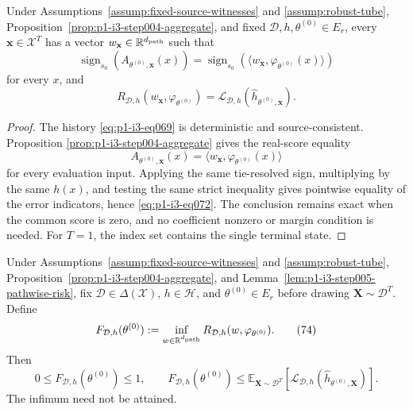 \begin{lemma}
\label{lem:p1-i3-step005-pathwise-risk}
Under Assumptions~\ref{assump:fixed-source-witnesses} and
\ref{assump:robust-tube}, Proposition~\ref{prop:p1-i3-step004-aggregate},
and fixed $\mathcal D,h,\theta^{(0)}\in E_r$, every
$\mathbf x\in\mathcal X^T$ has a vector $w_{\mathbf x}\in\mathbb R^{d_{\rm path}}$
such that
\[
\operatorname{sign}_{s_0}(A_{\theta^{(0)},\mathbf x}(x))
=\operatorname{sign}_{s_0}
\left(\langle w_{\mathbf x},\varphi_{\theta^{(0)}}(x)\rangle\right)
\tag{71}\label{eq:p1-i3-eq071}
\]
for every $x$, and
\[
R_{\mathcal D,h}(w_{\mathbf x},\varphi_{\theta^{(0)}})
=\mathcal L_{\mathcal D,h}(\widehat h_{\theta^{(0)},\mathbf x}).
\tag{72}\label{eq:p1-i3-eq072}
\]
\end{lemma}

\begin{proof}
The history \eqref{eq:p1-i3-eq069} is deterministic and source-consistent.  Proposition
\ref{prop:p1-i3-step004-aggregate} gives the real-score equality
\[
A_{\theta^{(0)},\mathbf x}(x)
=\langle w_{\mathbf x},\varphi_{\theta^{(0)}}(x)\rangle
\tag{73}\label{eq:p1-i3-eq073}
\]
for every evaluation input.  Applying the same tie-resolved sign, multiplying
by the same $h(x)$, and testing the same strict inequality gives pointwise
equality of the error indicators, hence \eqref{eq:p1-i3-eq072}.  The conclusion remains exact
when the common score is zero, and no coefficient nonzero or margin condition
is needed.  For $T=1$, the index set contains the single terminal state.
\end{proof}

\begin{proposition}
\label{prop:p1-i3-step005-conditional-comparison}
Under Assumptions~\ref{assump:fixed-source-witnesses} and
\ref{assump:robust-tube}, Proposition~\ref{prop:p1-i3-step004-aggregate},
and Lemma~\ref{lem:p1-i3-step005-pathwise-risk}, fix
$\mathcal D\in\Delta(\mathcal X)$, $h\in\mathcal H$, and
$\theta^{(0)}\in E_r$ before drawing $\mathbf X\sim\mathcal D^T$.  Define
\[
F_{\mathcal D,h}(\theta^{(0)}):=
\inf_{w\in\mathbb R^{d_{\rm path}}}
R_{\mathcal D,h}(w,\varphi_{\theta^{(0)}}).
\tag{74}\label{eq:p1-i3-eq074}
\]
Then
\[
0\leq F_{\mathcal D,h}(\theta^{(0)})\leq1,
\qquad
F_{\mathcal D,h}(\theta^{(0)})
\leq\mathbb E_{\mathbf X\sim\mathcal D^T}
\left[\mathcal L_{\mathcal D,h}
(\widehat h_{\theta^{(0)},\mathbf X})\right].
\tag{75}\label{eq:p1-i3-eq075}
\]
The infimum need not be attained.
\end{proposition}

